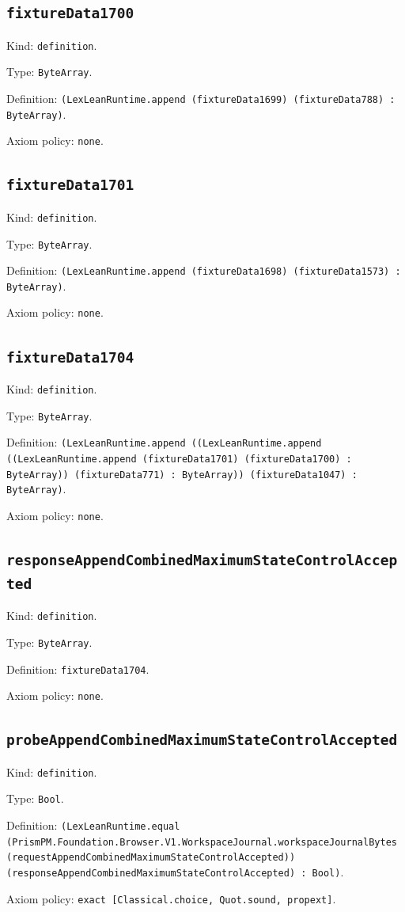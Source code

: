 \documentclass[11pt]{article}
\begin{document}
\subsection*{\texttt{fixtureData1700}}
\noindent Kind: \texttt{definition}.\par
\noindent Type: \texttt{ByteArray}.\par
\noindent Definition: \texttt{(LexLeanRuntime.append (fixtureData1699) (fixtureData788) : ByteArray)}.\par
\noindent Axiom policy: \texttt{none}.\par
\subsection*{\texttt{fixtureData1701}}
\noindent Kind: \texttt{definition}.\par
\noindent Type: \texttt{ByteArray}.\par
\noindent Definition: \texttt{(LexLeanRuntime.append (fixtureData1698) (fixtureData1573) : ByteArray)}.\par
\noindent Axiom policy: \texttt{none}.\par
\subsection*{\texttt{fixtureData1704}}
\noindent Kind: \texttt{definition}.\par
\noindent Type: \texttt{ByteArray}.\par
\noindent Definition: \texttt{(LexLeanRuntime.append ((LexLeanRuntime.append ((LexLeanRuntime.append (fixtureData1701) (fixtureData1700) : ByteArray)) (fixtureData771) : ByteArray)) (fixtureData1047) : ByteArray)}.\par
\noindent Axiom policy: \texttt{none}.\par
\subsection*{\texttt{responseAppendCombinedMaximumStateControlAccepted}}
\noindent Kind: \texttt{definition}.\par
\noindent Type: \texttt{ByteArray}.\par
\noindent Definition: \texttt{fixtureData1704}.\par
\noindent Axiom policy: \texttt{none}.\par
\subsection*{\texttt{probeAppendCombinedMaximumStateControlAccepted}}
\noindent Kind: \texttt{definition}.\par
\noindent Type: \texttt{Bool}.\par
\noindent Definition: \texttt{(LexLeanRuntime.equal (PrismPM.Foundation.Browser.V1.WorkspaceJournal.workspaceJournalBytes (requestAppendCombinedMaximumStateControlAccepted)) (responseAppendCombinedMaximumStateControlAccepted) : Bool)}.\par
\noindent Axiom policy: \texttt{exact [Classical.choice, Quot.sound, propext]}.\par
\end{document}
